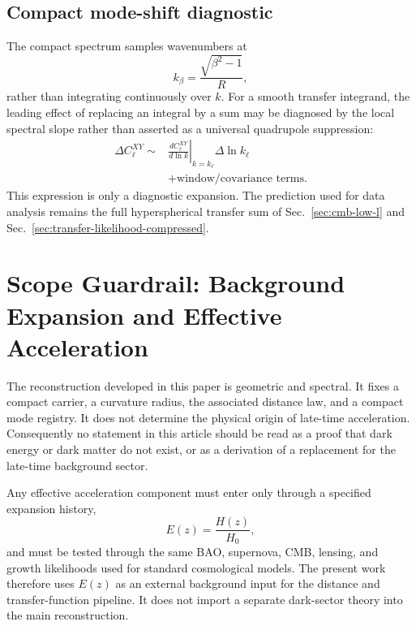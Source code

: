 \documentclass[aps,prd,onecolumn,superscriptaddress,longbibliography,nofootinbib,notitlepage]{revtex4-2}
\begin{document}
\subsection{Compact mode-shift diagnostic}
\label{sec:mode-shift-diagnostic}

The compact spectrum samples wavenumbers at
\begin{equation}
  k_\beta=\frac{\sqrt{\beta^2-1}}{R},
\end{equation}
rather than integrating continuously over $k$. For a smooth transfer integrand,
the leading effect of replacing an integral by a sum may be diagnosed by the local
spectral slope rather than asserted as a universal quadrupole suppression:
\begin{equation}
\begin{aligned}
  \Delta C_\ell^{XY}\sim
  &\left.\frac{d C_\ell^{XY}}{d\ln k}\right|_{k=k_\ell}
  \Delta\ln k_\ell \\
  &+\text{window/covariance terms}.
\end{aligned}
\end{equation}
This expression is only a diagnostic expansion. The prediction used for data
analysis remains the full hyperspherical transfer sum of
Sec.~\ref{sec:cmb-low-l} and Sec.~\ref{sec:transfer-likelihood-compressed}.


\section{Scope Guardrail: Background Expansion and Effective Acceleration}
\label{sec:background-expansion-scope}

The reconstruction developed in this paper is geometric and spectral. It fixes a
compact carrier, a curvature radius, the associated distance law, and a compact
mode registry. It does not determine the physical origin of late-time acceleration.
Consequently no statement in this article should be read as a proof that dark
energy or dark matter do not exist, or as a derivation of a replacement for the
late-time background sector.

Any effective acceleration component must enter only through a specified expansion
history,
\begin{equation}
  E(z)=\frac{H(z)}{H_0},
\end{equation}
and must be tested through the same BAO, supernova, CMB, lensing, and growth
likelihoods used for standard cosmological models. The present work therefore
uses $E(z)$ as an external background input for the distance and transfer-function
pipeline. It does not import a separate dark-sector theory into the main
reconstruction.
\end{document}
